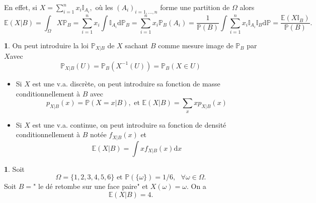 \documentclass[8pt,notheorems]{beamer}
\def \E{\mathbb E}
\renewcommand{\Pr}{\mathbb{P}}
\theoremstyle{definition}
\theoremstyle{example}
\newtheorem{example}{\translate{Exemple}}
\newtheorem{remark}{\translate{Remarque}}
\theoremstyle{mystyle}
\theoremstyle{plain}
\begin{document}
\begin{frame}[allowframebreaks]
En effet, si $X = \sum_{i = 1}^n x_i\mathbb{I}_{A_i},$ où les $(A_i)_{i = 1,\ldots, n}$ forme une partition de $\Omega$ alors 
$$
\E(X|B) = \int_\Omega X\mathbb{P}_B = \sum_{i = 1}^n x_i\int \mathbb{I}_{A_i}\text{d}\Pr_B = \sum_{i = 1}^n x_i\Pr_B(A_i) =\frac{1}{\Pr(B)}  \int\sum_{i = 1}^n x_i\mathbb{I}_{A_i}\mathbb{I}_B\text{d}\Pr
 = \frac{\E(X\mathbb{I}_B)}{\Pr(B)}.$$
\begin{remark}
On peut introduire la loi $\Pr_{X|B}$ de $X$ sachant $B$ comme mesure image de $\mathbb{P}_B$ par $X$avec 
$$
\Pr_{X|B}(U) =\Pr_{B}(X^{-1}(U)) = \Pr_{B}(X\in U)
$$
\begin{itemize}
\item Si $X$ est une v.a. discrète, on peut introduire sa fonction de masse conditionnellement à $B$ avec 
$$
p_{X|B}(x) =  \Pr(X = x|B), \text{ et }\E(X|B) = \sum_x x p_{X|B}(x)
$$
\item Si $X$ est une v.a. continue, on peut introduire sa fonction de densité conditionnellement à $B$ notée $f_{X|B}(x)$ et 
$$
\E(X|B) = \int x f_{X|B}(x)\text{d}x
$$
\end{itemize}
\end{remark}
\begin{example}
Soit 
$$
\Omega = \{1,2,3,4,5,6\}\text{ et }\Pr(\{\omega\}) = 1/6,\text{ }\forall \omega\in \Omega.
$$ 
Soit $B = $" le dé retombe sur une face paire" et $X(\omega) = \omega$. On a 
$$
\E(X|B) = 4.
$$ 
\end{example}
\end{frame}
\end{document}
